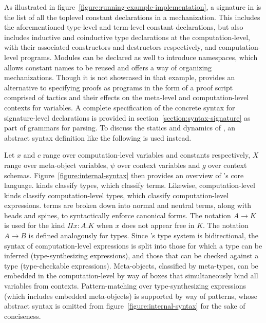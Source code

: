 \clearpage

As illustrated in figure~\ref{figure:running-example-implementation}, a signature in \Beluga is the list of all the toplevel constant declarations in a mechanization.
This includes the aforementioned \LF type-level and term-level constant declarations, but also includes inductive and coinductive type declarations at the computation-level, with their associated constructors and destructors respectively, and computation-level programs.
Modules can be declared as well to introduce namespaces, which allows constant names to be reused and offers a way of organizing mechanizations.
Though it is not showcased in that example, \Harpoon provides an alternative to specifying proofs as programs in the form of a proof script comprised of tactics and their effects on the meta-level and computation-level contexts for variables.
A complete specification of the concrete syntax for signature-level declarations is provided in section~\ref{section:syntax-signature} as part of grammars for parsing.
To discuss the statics and dynamics of \Beluga, an abstract syntax definition like the following is used instead.

Let $x$ and $c$ range over computation-level variables and constants respectively, $X$ range over meta-object variables, $\psi$ over context variables and $g$ over context schemas.
Figure~\ref{figure:internal-syntax} then provides an overview of \Beluga's core language.
\LF kinds classify \LF types, which classify \LF terms.
Likewise, computation-level kinds classify computation-level types, which classify computation-level expressions.
\LF terms are broken down into normal and neutral terms, along with heads and spines, to syntactically enforce canonical forms.
The notation $A \to K$ is used for the \LF kind $\Pi x{:}A. K$ when $x$ does not appear free in $K$.
The notation $A \to B$ is defined analogously for \LF types.
Since \Beluga's type system is bidirectional, the syntax of computation-level expressions is split into those for which a type can be inferred (type-synthesizing expressions), and those that can be checked against a type (type-checkable expressions).
Meta-objects, classified by meta-types, can be embedded in the computation-level by way of boxes that simultaneously bind all variables from \LF contexts.
Pattern-matching over type-synthesizing expressions (which includes embedded meta-objects) is supported by way of patterns, whose abstract syntax is omitted from figure~\ref{figure:internal-syntax} for the sake of conciseness.

